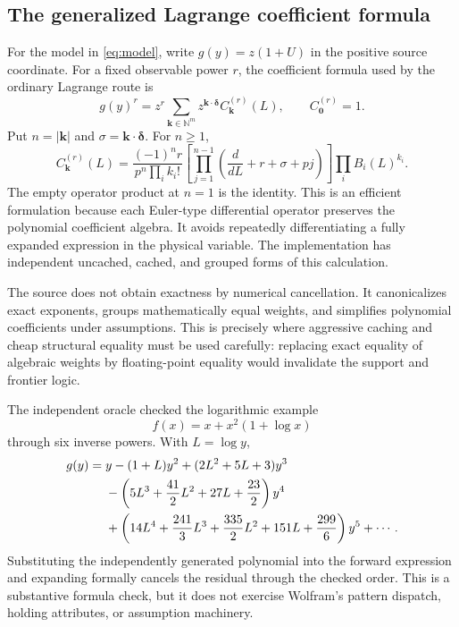 \documentclass[11pt,a4paper]{article}
\newcommand{\N}{\mathbb N}
\theoremstyle{definition}
\begin{document}
\subsection{The generalized Lagrange coefficient formula}

For the model in \eqref{eq:model}, write $g(y)=z(1+U)$ in the positive source coordinate. For a fixed observable power $r$, the coefficient formula used by the ordinary Lagrange route is
\begin{equation}
 g(y)^r=z^r\sum_{\boldsymbol k\in\N^m}
 z^{\boldsymbol k\cdot\boldsymbol\delta}
 C_{\boldsymbol k}^{(r)}(L),\qquad C_{\boldsymbol0}^{(r)}=1.
 \label{eq:inverse-series}
\end{equation}
Put $n=|\boldsymbol k|$ and $\sigma=\boldsymbol k\cdot\boldsymbol\delta$. For $n\ge1$,
\begin{equation}
 C_{\boldsymbol k}^{(r)}(L)=
 \frac{(-1)^n r}{p^n\prod_i k_i!}
 \left[\prod_{j=1}^{n-1}
   \left(\frac{d}{dL}+r+\sigma+pj\right)\right]
 \prod_i B_i(L)^{k_i}.
 \label{eq:euler-coefficient}
\end{equation}
The empty operator product at $n=1$ is the identity. This is an efficient formulation because each Euler-type differential operator preserves the polynomial coefficient algebra. It avoids repeatedly differentiating a fully expanded expression in the physical variable. The implementation has independent uncached, cached, and grouped forms of this calculation.\cite{core,incremental}

The source does not obtain exactness by numerical cancellation. It canonicalizes exact exponents, groups mathematically equal weights, and simplifies polynomial coefficients under assumptions. This is precisely where aggressive caching and cheap structural equality must be used carefully: replacing exact equality of algebraic weights by floating-point equality would invalidate the support and frontier logic.

The independent oracle checked the logarithmic example
\begin{equation}
 f(x)=x+x^2(1+\log x)
 \label{eq:log-example}
\end{equation}
through six inverse powers. With $L=\log y$,
\begin{align}
 g(y)={}&y-(1+L)y^2+(2L^2+5L+3)y^3\notag\\
 &-\left(5L^3+\frac{41}{2}L^2+27L+\frac{23}{2}\right)y^4\notag\\
 &+\left(14L^4+\frac{241}{3}L^3+\frac{335}{2}L^2
       +151L+\frac{299}{6}\right)y^5+\cdots.
 \label{eq:log-coefficients}
\end{align}
Substituting the independently generated polynomial into the forward expression and expanding formally cancels the residual through the checked order. This is a substantive formula check, but it does not exercise Wolfram's pattern dispatch, holding attributes, or assumption machinery.
\end{document}
